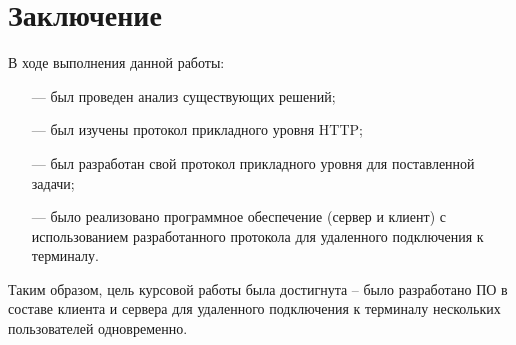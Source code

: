 \chapter*{Заключение}


В ходе выполнения данной работы:

\begin{itemize}
	\item[---] был проведен анализ существующих решений;
	\item[---] был изучены протокол прикладного уровня HTTP;
	\item[---] был разработан свой протокол прикладного уровня для поставленной задачи;
	\item[---] было реализовано программное обеспечение (сервер и клиент) с использованием разработанного протокола для удаленного подключения к терминалу.
\end{itemize}

Таким образом, цель курсовой работы была достигнута -- было разработано ПО в составе клиента и сервера для удаленного подключения к терминалу нескольких пользователей одновременно.